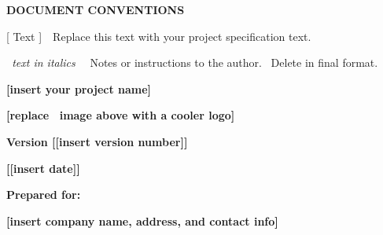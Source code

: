 \documentclass[twoside,letterpaper]{article}
\begin{document}
\bigskip


\bigskip

{\centering{}\bfseries\color{black}
DOCUMENT CONVENTIONS
\par}


\bigskip

{\color{black}
[ Text ]\ \ Replace this text with your project specification text.}


\bigskip

{\color{black}
\foreignlanguage{english}{\textit{\ }}\foreignlanguage{english}{\textit{text
in italics }}\foreignlanguage{english}{\ \ Notes or instructions to the
author. \ Delete in final format.}}


\bigskip


\bigskip



\bigskip

{\centering{}\bfseries\color{black}
[insert your project name]
\par}


\bigskip


\bigskip


\bigskip

{\centering{}\bfseries\color{black}
\foreignlanguage{english}{[}\foreignlanguage{english}{replace \ image
above with a cooler logo]}
\par}

\bigskip


\bigskip

{\centering{}\bfseries\color{black}
Version [[insert version number]]
\par}

{\centering{}\bfseries\color{black}
[[insert date]]
\par}


\bigskip


\bigskip

{\centering{}\bfseries\color{black}
Prepared for:
\par}

{\centering{}\bfseries\color{black}
[insert company name, address, and contact info]
\par}
\end{document}
